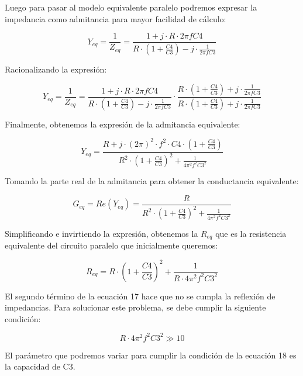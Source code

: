 Luego para pasar al modelo equivalente paralelo podremos expresar la impedancia como admitancia para mayor facilidad de cálculo:

\begin{equation}
    Y_{eq} = \frac{1}{Z_{eq}} = \frac{1 + j \cdot R \cdot 2 \pi f C4}{R \cdot (1 + \frac{C4}{C3}) - j \cdot \frac{1}{2 \pi f C3}}
\end{equation}

Racionalizando la expresión:

\begin{equation}
    Y_{eq} =  \frac{1}{Z_{eq}} = \frac{1 + j \cdot R \cdot 2 \pi f C4}{R \cdot (1 + \frac{C4}{C3}) - j \cdot \frac{1}{2 \pi f C3}} \cdot \frac{R \cdot (1 + \frac{C4}{C3}) + j \cdot \frac{1}{2 \pi f C3}}{R \cdot (1 + \frac{C4}{C3}) + j \cdot \frac{1}{2 \pi f C3}}
\end{equation}

Finalmente, obtenemos la expresión de la admitancia equivalente:

\begin{equation}
    Y_{eq} = \frac{R + j \cdot (2 \pi)^2 \cdot f^2 \cdot C4 \cdot (1 + \frac{C4}{C3})}{R^2 \cdot (1 + \frac{C4}{C3})^2 + \frac{1}{4 \pi^2 f^2 C3^2}}
\end{equation}

Tomando la parte real de la admitancia para obtener la conductancia equivalente:

\begin{equation}
    G_{eq}= Re(Y_{eq}) = \frac{R}{R^2 \cdot (1 + \frac{C4}{C3})^2 + \frac{1}{4 \pi^2 f^2 C3^2}}
\end{equation}

Simplificando e invirtiendo la expresión, obtenemos la $R_{eq}$ que es la resistencia equivalente del circuito paralelo que inicialmente queremos:

\begin{equation}
    R_{eq} = R \cdot (1 + \frac{C4}{C3})^2 + \frac{1}{R \cdot 4 \pi^2 f^2 C3^2}
\end{equation}

El segundo término de la ecuación 17 hace que no se cumpla la reflexión de impedancias. Para solucionar este problema, se debe cumplir la siguiente condición:

\begin{equation}
    R \cdot 4 \pi^2 f^2 C3^2 \gg 10 
\end{equation}

El parámetro que podremos variar para cumplir la condición de la ecuación 18 es la capacidad de C3. 
